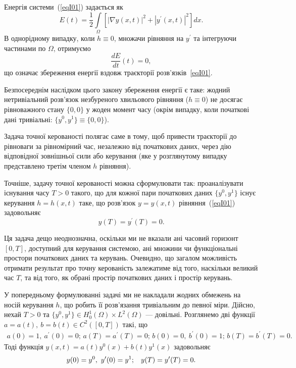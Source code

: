 Енергія системи~(\ref{eqI01}) задається як
\begin{equation}\label{eqI02}
E(t) = \frac{1}{2}\int\limits_{\Omega} \left[ \left|\nabla y(x,t) \right|^2 + \left| y^{\prime}(x,t) \right|^2 \right] d x.
\end{equation}
В однорідному випадку, коли $h\equiv0$, множачи рівняння на $y^\prime$ та інтегруючи частинами по $\Omega$, отримуємо
\begin{equation*}
\frac{dE}{dt} (t) = 0,
\end{equation*}
що означає збереження енергії вздовж траєкторії розв'язків~\eqref{eqI01}.


Безпосереднім наслідком цього закону збереження енергії є таке: жодний нетривіальний розв'язок незбуреного хвильового рівняння ($h \equiv 0$) не досягає рівноважного стану $\{0,0\}$ у жоден момент часу (окрім випадку, коли початкові дані тривіальні: $\{y^0,y^1\} \equiv \{0,0\}$).

Задача точної керованості полягає саме в тому, щоб привести траєкторії до рівноваги за рівномірний час, незалежно від початкових даних, через дію відповідної зовнішньої сили або керування (яке у розглянутому випадку представлено третім членом $h$ рівняння).

Точніше, задачу точної керованості можна сформулювати так: проаналізувати існування часу $T> 0$ такого, що для кожної пари початкових даних $\{y^0, y^1\}$ існує керування $h = h(x, t)$ таке, що розв'язок $y = y(x, t)$ рівняння~(\ref{eqI01}) задовольняє
\begin{equation}\label{eqI03}
y(T) = y^\prime(T) = 0.
\end{equation}

Ця задача дещо неоднозначна, оскільки ми не вказали ані часовий горизонт $[0,T]$, доступний для керування системою, ані множини чи функціональні простори початкових даних та керувань. Очевидно, що загалом можливість отримати результат про точну керованість залежатиме від того, наскільки великий час $T$, та від того, як обрані простір початкових даних і простір керувань.

У попередньому формулюванні задачі ми не накладали жодних обмежень на носій керування $h$, що робить її розв'язання тривіальним до певної міри. Дійсно, нехай $T>0$ та $\{y^0, y^1\} \in H^1_0 (\Omega) \times L^2(\Omega)$ — довільні. Розглянемо дві функції $a = a(t),\ b = b(t) \in C^2 ([0,T])$ такі, що
\begin{eqnarray*}
a(0) = 1,\ a^\prime (0) = 0 ;\, a(T) = a^\prime(T) = 0;\,
b(0) = 0,\ b^\prime (0) = 1 ;\, b(T) = b^\prime(T) = 0.
\end{eqnarray*}
Тоді функція
$
y(x,t) = a(t)y^0 (x) + b(t) y^1 (x)
$
задовольняє
\begin{equation*}
y(0) = y^0,\ y^\prime (0) = y^1 ; \hspace{0.3cm} y(T) = y^\prime (T) = 0.
\end{equation*}

